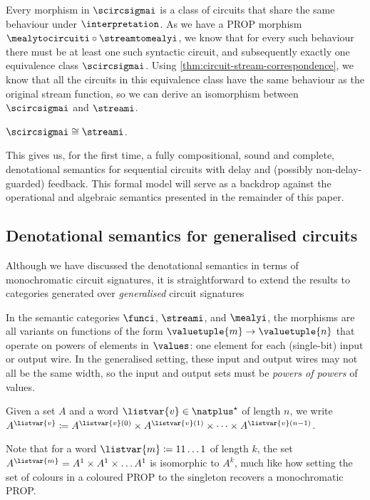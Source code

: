 \documentclass{lmcs}
\begin{document}
Every morphism in \(\scircsigmai\) is a class of circuits that share the
same behaviour under \(\interpretation\).
As we have a PROP morphism \(\mealytocircuiti \circ \streamtomealyi\), we know
that for every such behaviour there must be at least one such syntactic circuit,
and subsequently exactly one equivalence class \(\scircsigmai\).
Using \autoref{thm:circuit-stream-correspondence}, we know that all the circuits in
this equivalence class have the same behaviour as the original stream function,
so we can derive an isomorphism between \(\scircsigmai\) and
\(\streami\).

\begin{cor}
    \(\scircsigmai \cong \streami\).
\end{cor}

This gives us, for the first time, a fully compositional, sound and complete,
denotational semantics for sequential circuits with delay and (possibly
non-delay-guarded) feedback.
This formal model will serve as a backdrop against the operational and
algebraic semantics presented in the remainder of this paper.

\subsection{Denotational semantics for generalised circuits}

Although we have discussed the denotational semantics in terms of monochromatic
circuit signatures, it is straightforward to extend the results to categories
generated over \emph{generalised} circuit signatures

In the semantic categories \(\funci\), \(\streami\), and \(\mealyi\), the
morphisms are all variants on functions of the form
\(\valuetuple{m} \to \valuetuple{n}\) that operate on powers of elements in
\(\values\): one element for each (single-bit) input or output wire.
In the generalised setting, these input and output wires may not all be the
same width, so the input and output sets must be \emph{powers of powers} of
values.

\begin{nota}
    Given a set \(A\) and a word \(\listvar{v} \in \natplus^\star\) of
    length \(n\), we write \(
    A^{\listvar{v}}
    \coloneqq
    A^{\listvar{v}(0)}
    \times
    A^{\listvar{v}(1)}
    \times
    \dots
    \times
    A^{\listvar{v}(n-1)}
    \).
\end{nota}

Note that for a word \(\listvar{m} \coloneqq 11\dots1\) of length \(k\), the set
\(A^{\listvar{m}} = A^1 \times A^1 \times \dots A^1\) is isomorphic to \(A^k\),
much like how setting the set of colours in a coloured PROP to the singleton
recovers a monochromatic PROP.
\end{document}
